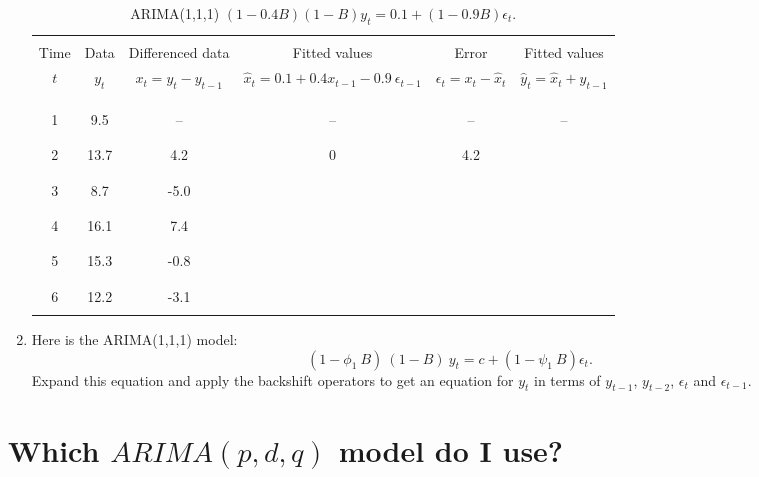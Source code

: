 \documentclass[a4paper,11pt,oneside,onecolumn]{book}
\begin{document}
\begin{enumerate}
\vspace{.2cm}
\begin{table}[!h]
\begin{center}
\begin{tabular}{cccccc} \hline
& & & & & \\
Time & Data & Differenced data & Fitted values & Error & Fitted values \\
$t$ & $y_t$ & $x_t=y_t-y_{t-1}$ & $\hat{x}_t = 0.1+0.4x_{t-1}-0.9\ \epsilon_{t-1}$ & $\epsilon_t = x_t-\hat{x}_t$ & $\hat{y}_t = \hat{x}_t + y_{t-1}$ \\
& & & & & \\
\hline
& & & & & \\
& & & & & \\
1 & 9.5 & -- & -- & -- & -- \\
& & & & & \\
& & & & & \\
2 & 13.7 & 4.2 & 0 & 4.2 & \\
& & & & & \\
& & & & & \\
3 & 8.7 & -5.0 & & & \\
& & & & & \\
& & & & & \\
4 & 16.1 & 7.4 & & & \\
& & & & & \\
& & & & & \\
5 & 15.3 & -0.8 & & & \\
& & & & & \\
& & & & & \\
6 & 12.2 & -3.1 & & & \\
& & & & & \\
\hline
\end{tabular}
\end{center}
\caption{ARIMA(1,1,1) $(1 - 0.4 B) (1-B) y_t = 0.1 + (1-0.9B) \epsilon_t. $}
\end{table}
\vspace{.2cm}

\item Here is the ARIMA(1,1,1) model:
\[ (1- \phi_1\ B) \ (1-B)\ y_t = c + (1 - \psi_1\ B) \epsilon_t. \]
Expand this equation and apply the backshift operators to get an
equation for $y_t$ in terms of $y_{t-1}$, $y_{t-2}$, $\epsilon_t$ and
$\epsilon_{t-1}$.


\end{enumerate}


\section{Which $ARIMA(p,d,q)$ model do I use?}
\end{document}
